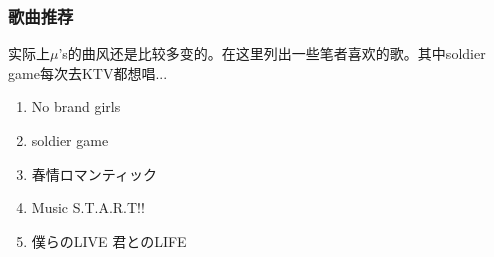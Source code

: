 \documentclass{ctexart}
\begin{document}
\subsubsection*{歌曲推荐}
实际上$\mu$'s的曲风还是比较多变的。在这里列出一些笔者喜欢的歌。其中soldier game每次去KTV都想唱...
\begin{enumerate}
\item No brand girls
\item soldier game
\item 春情ロマンティック
\item Music S.T.A.R.T!!
\item 僕らのLIVE 君とのLIFE
\end{enumerate}
\end{document}
